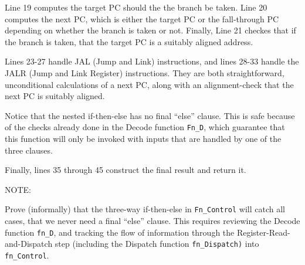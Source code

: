 Line 19 computes the target PC should the the branch be taken.  Line
20 computes the next PC, which is either the target PC or the
fall-through PC depending on whether the branch is taken or not.
Finally, Line 21 checkes that if the branch is taken, that the target
PC is a suitably aligned address.

Lines 23-27 handle JAL (Jump and Link) instructions, and lines 28-33
handle the JALR (Jump and Link Register) instructions.  They are both
straightforward, unconditional calculations of a next PC, along with
an alignment-check that the next PC is suitably aligned.

Notice that the nested if-then-else has no final ``else'' clause.
This is safe because of the checks already done in the Decode function
\verb|Fn_D|, which guarantee that this function will only be invoked
with inputs that are handled by one of the three clauses.

Finally, lines 35 through 45 construct the final result and return it.

\vspace*{2ex}

NOTE:

\vspace*{2ex}

\hdivider

\Exercise

Prove (informally) that the three-way if-then-else in
\verb|Fn_Control| will catch all cases, {\ie} that we never need a
final ``else'' clause.  This requires reviewing the Decode function
\verb|fn_D|, and tracking the flow of information through the
Register-Read-and-Dispatch step (including the Dispatch function
\verb|fn_Dispatch)| into \verb|fn_Control|.

